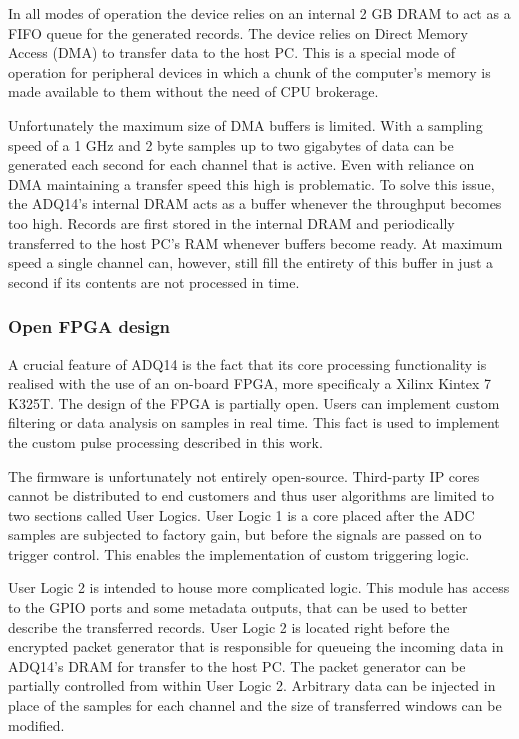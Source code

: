 In all modes of operation the device relies on an internal 2 GB DRAM
to act as a FIFO queue for the generated records.
The device relies on Direct Memory Access (DMA) to transfer
data to the host PC. This is a special mode of operation for 
peripheral devices in which a chunk of the computer's memory is
made available to them without the need of CPU brokerage.


Unfortunately the maximum size of DMA buffers is limited. 
With a sampling speed of a 1 GHz and 2 byte samples up 
to two gigabytes of data can be generated each second for each
channel that is active. Even with reliance on DMA maintaining 
a transfer speed this high is problematic. To solve this issue, 
the ADQ14's internal DRAM acts as a buffer 
whenever the throughput becomes too high.
Records are first stored in the internal DRAM and periodically
transferred to the host PC's RAM whenever buffers become ready.
At maximum speed a single channel can, however, still fill the entirety
of this buffer in just a second if its contents are not processed in time.

\subsubsection{Open FPGA design}

A crucial feature of ADQ14 is the fact that its core processing
functionality is realised with the use of an on-board FPGA,
more specificaly a Xilinx Kintex 7 K325T. The design of the FPGA
is partially open. Users can implement custom
filtering or data analysis on samples in real time.
This fact is used to implement the custom pulse processing described in this work.


The firmware is unfortunately not entirely open-source.
Third-party IP cores cannot be distributed to end customers 
and thus user algorithms are limited to two sections called User Logics.
User Logic 1 is a core placed after the ADC samples are subjected to factory
gain, but before the signals are passed on to trigger control.
This enables the implementation of custom triggering logic.


User Logic 2 is intended to house more complicated logic.
This module has access to the GPIO ports and some metadata
outputs, that can be used to better describe the transferred records.
User Logic 2 is located right before the encrypted packet generator
that is responsible for queueing the incoming data in ADQ14's DRAM 
for transfer to the host PC. The packet generator can be partially
controlled from within User Logic 2. Arbitrary data can be injected
in place of the samples for each channel and the size of transferred windows 
can be modified.

